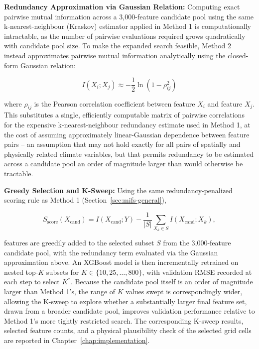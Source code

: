 \textbf{Redundancy Approximation via Gaussian Relation:} Computing exact pairwise mutual information across a 3,000-feature candidate pool using the same k-nearest-neighbour (Kraskov) estimator applied in Method 1 is computationally intractable, as the number of pairwise evaluations required grows quadratically with candidate pool size. To make the expanded search feasible, Method 2 instead approximates pairwise mutual information analytically using the closed-form Gaussian relation:

\begin{equation}
I(X_i; X_j) \approx -\frac{1}{2}\ln\left(1 - \rho_{ij}^2\right)
\end{equation}

\noindent where $\rho_{ij}$ is the Pearson correlation coefficient between feature $X_i$ and feature $X_j$. This substitutes a single, efficiently computable matrix of pairwise correlations for the expensive k-nearest-neighbour redundancy estimate used in Method 1, at the cost of assuming approximately linear-Gaussian dependence between feature pairs -- an assumption that may not hold exactly for all pairs of spatially and physically related climate variables, but that permits redundancy to be estimated across a candidate pool an order of magnitude larger than would otherwise be tractable.

\textbf{Greedy Selection and K-Sweep:} Using the same redundancy-penalized scoring rule as Method 1 (Section~\ref{sec:mifs-general}),

\begin{equation}
S_{\text{score}}(X_{\text{cand}}) = I(X_{\text{cand}}; Y) - \frac{1}{|S|} \sum_{X_k \in S} I(X_{\text{cand}}; X_k),
\end{equation}

\noindent features are greedily added to the selected subset $S$ from the 3,000-feature candidate pool, with the redundancy term evaluated via the Gaussian approximation above. An XGBoost model is then incrementally retrained on nested top-$K$ subsets for $K \in \{10, 25, \ldots, 800\}$, with validation RMSE recorded at each step to select $K^*$. Because the candidate pool itself is an order of magnitude larger than Method 1's, the range of $K$ values swept is correspondingly wider, allowing the K-sweep to explore whether a substantially larger final feature set, drawn from a broader candidate pool, improves validation performance relative to Method 1's more tightly restricted search. The corresponding K-sweep results, selected feature counts, and a physical plausibility check of the selected grid cells are reported in Chapter~\ref{chap:implementation}.

